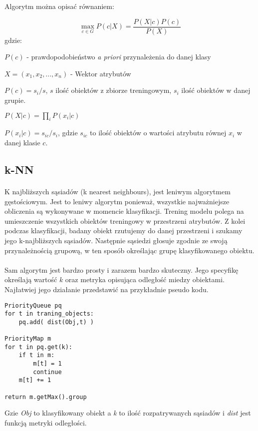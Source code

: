 \documentclass[a4paper,12pt]{article}
\begin{document}
Algorytm można opisać równaniem:

\[
\max_{c \in G} P(c | X) = \frac{P(X|c)P(c)}{P(X)}
\]
gdzie:

$P(c)$ - prawdopodobieństwo \textit{a priori} przynależenia do danej klasy

$X = (x_1,x_2,...,x_n)$ - Wektor atrybutów 

$P(c) = s_i / s$, $s$ ilość obiektów z zbiorze treningowym, $s_i$ ilość obiektów w danej grupie. 

$P(X|c) = \prod\limits_{i} P(x_i | c)$

$P(x_i | c) = s_{ic} / s_i$, gdzie $s_{ic}$ to ilość obiektów o wartości atrybutu równej $x_i$ w danej klasie $c$.


\subsection{k-NN}
\paragraph{}
K najbliższych sąsiadów (k nearest neighbours), jest leniwym algorytmem
gęstościowym. Jest to leniwy algorytm ponieważ, wszystkie najważniejsze
obliczenia są wykonywane w momencie klasyfikacji. Trening modelu polega na
umieszczenie wszystkich obiektów treningowy w przestrzeni atrybutów. Z kolei
podczas klasyfikacji, badany obiekt rzutujemy do danej przestrzeni i szukamy
jego k-najbliższych sąsiadów. Następnie sąsiedzi głosuje zgodnie ze swoją
przynależnością grupową, w ten sposób określając grupę klasyfikowanego
obiektu. 

\paragraph{} Sam algorytm jest bardzo prosty i zarazem bardzo skuteczny. Jego
specyfikę określają wartość $k$ oraz metryka opisująca odległość miedzy
obiektami. Najłatwiej jego działanie przedstawić na przykładnie pseudo kodu.

\begin{verbatim}
PriorityQueue pq
for t in traning_objects:
    pq.add( dist(Obj,t) )

PriorityMap m
for t in pq.get(k):
    if t in m:
        m[t] = 1
        continue
    m[t] += 1 

return m.getMax().group
\end{verbatim}

Gzie \textit{Obj} to klasyfikowany obiekt a \textit{k} to ilość
rozpatrywanych sąsiadów i \textit{dist} jest funkcją metryki odległości.
\end{document}
